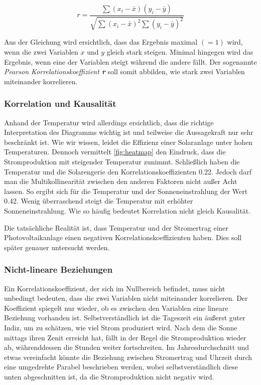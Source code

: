 \documentclass[12pt, a4paper]{article}
\begin{document}
\begin{equation}
r=\frac{\sum(x_i - \bar{x})(y_i - \bar{y})}
{\sqrt{\sum(x_i - \bar{x})^2\sum(y_i -  \bar{y})^2}}
\end{equation}


Aus der Gleichung wird ersichtlich, dass das Ergebnis maximal $(=1)$ wird, wenn die zwei Variablen $x$ und $y$ gleich stark steigen. Minimal hingegen wird das Ergebnis, wenn eine der Variablen steigt während die andere fällt. Der sogenannte \textit{Pearson Korrelationskoeffizient \textbf{r}} soll somit abbilden, wie stark zwei Variablen miteinander korrelieren. 

\subsubsection{Korrelation und Kausalität}

Anhand der Temperatur wird allerdings ersichtlich, dass die richtige Interpretation des Diagramms wichtig ist und teilweise die Aussagekraft nur sehr beschränkt ist. Wie wir wissen, leidet die Effizienz einer Solaranlage unter hohen Temperaturen. Dennoch vermittelt \autoref{fig:heatmap} den Eindruck, dass die Stromproduktion mit steigender Temperatur zunimmt. Schließlich haben die Temperatur und die Solarengerie den Korrelationskoeffizienten 0.22. Jedoch darf man die Multikollinearität zwischen den anderen Faktoren nicht außer Acht lassen. So ergibt sich für die Temperatur und der Sonneneinstrahlung der Wert 0.42. Wenig überraschend steigt die Temperatur mit erhöhter Sonneneinstrahlung. Wie so häufig bedeutet Korrelation nicht gleich Kausalität. 

Die tatsächliche Realität ist, dass Temperatur und der Stromertrag einer Photovoltaikanlage einen negativen Korrelationskoeffizienten haben. Dies soll später genauer untersucht werden.

\subsubsection{Nicht-lineare Beziehungen}

Ein Korrelationskoeffizient, der sich im Nullbereich befindet, muss nicht unbedingt bedeuten, dass die zwei Variablen nicht miteinander korrelieren. Der Koeffizient spiegelt nur wieder, ob es zwischen den Variablen eine lineare Beziehung vorhanden ist. Selbstverständlich ist die Tageszeit ein äußerst guter Indiz, um zu schätzen, wie viel Strom produziert wird. Nach dem die Sonne mittags ihren Zenit erreicht hat, fällt in der Regel die Stromproduktion wieder ab, währenddessen die Stunden weiter fortschreiten. Im Jahresdurchschnitt und etwas vereinfacht könnte die Beziehung zwischen Stromertrag und Uhrzeit durch eine umgedrehte Parabel beschrieben werden, wobei selbstverständlich diese unten abgeschnitten ist, da die Stromproduktion nicht negativ wird.
\end{document}
